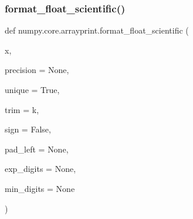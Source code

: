  \mbox{\label{namespacenumpy_1_1core_1_1arrayprint_a2cea445365c52268e6a9ff8e31fab046}} 
\subsubsection{\texorpdfstring{format\+\_\+float\+\_\+scientific()}{format\_float\_scientific()}}
{\footnotesize\ttfamily def numpy.\+core.\+arrayprint.\+format\+\_\+float\+\_\+scientific (\begin{DoxyParamCaption}\item[{}]{x,  }\item[{}]{precision = {\ttfamily None},  }\item[{}]{unique = {\ttfamily True},  }\item[{}]{trim = {\ttfamily \textquotesingle{}k\textquotesingle{}},  }\item[{}]{sign = {\ttfamily False},  }\item[{}]{pad\+\_\+left = {\ttfamily None},  }\item[{}]{exp\+\_\+digits = {\ttfamily None},  }\item[{}]{min\+\_\+digits = {\ttfamily None} }\end{DoxyParamCaption})}

